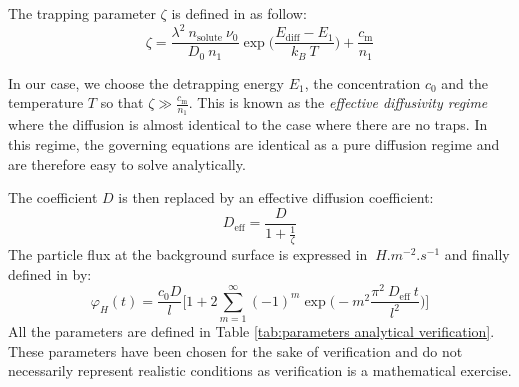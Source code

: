 The trapping parameter $\zeta$ is defined in  as follow:
\begin{equation}
    \zeta = \frac{\lambda^2 \: n_\mathrm{solute} \: \nu_0}{D_0 \: n_1}\exp\bigg(\frac{E_\mathrm{diff} - E_1}{k_B \: T}\bigg) + \frac{c_\mathrm{m}}{n_1}
\end{equation}

In our case, we choose the detrapping energy $E_1$, the concentration $c_0$ and the temperature $T$ so that $\zeta \gg \frac{c_\mathrm{m}}{n_1}$.
This is known as the \textit{effective diffusivity regime} where the diffusion is almost identical to the case where there are no traps.
In this regime, the governing equations are identical as a pure diffusion regime and are therefore easy to solve analytically.

The coefficient $D$ is then replaced by an effective diffusion coefficient:
\begin{equation}
    D_\mathrm{eff} = \frac{D}{1+\frac{1}{\zeta}}
\end{equation}
The particle flux at the background surface is expressed in $\SI{}{H.m^{-2}.s^{-1}}$ and finally defined in  by:
\begin{equation}
    \varphi_H(t) = \frac{c_0 D}{l}\bigg[1+2\sum_{m=1}^{\infty}(-1)^m \exp\bigg(-m^2\frac{\pi^2 \:D_\mathrm{eff} \: t}{l^2}\bigg)\bigg]
\label{eq:flux analytical}
\end{equation}
All the parameters are defined in Table \ref{tab:parameters analytical verification}.
These parameters have been chosen for the sake of verification and do not necessarily represent realistic conditions as verification is a mathematical exercise.
